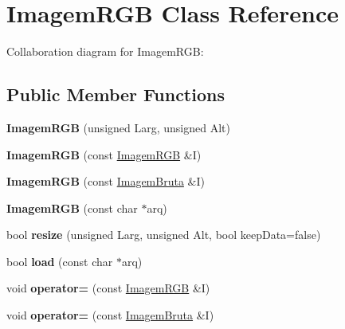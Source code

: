 \hypertarget{classImagemRGB}{}\section{Imagem\+R\+GB Class Reference}
\label{classImagemRGB}


Collaboration diagram for Imagem\+R\+GB\+:
\subsection*{Public Member Functions}
\begin{DoxyCompactItemize}
\item 
{\bfseries Imagem\+R\+GB} (unsigned Larg, unsigned Alt)\hypertarget{classImagemRGB_a94d1613764f95a46939aeba3f8acbdcd}{}\label{classImagemRGB_a94d1613764f95a46939aeba3f8acbdcd}

\item 
{\bfseries Imagem\+R\+GB} (const \hyperlink{classImagemRGB}{Imagem\+R\+GB} \&I)\hypertarget{classImagemRGB_a97d9fbc53efb4e5e2df75cf07bd8eefe}{}\label{classImagemRGB_a97d9fbc53efb4e5e2df75cf07bd8eefe}

\item 
{\bfseries Imagem\+R\+GB} (const \hyperlink{classImagemBruta}{Imagem\+Bruta} \&I)\hypertarget{classImagemRGB_a6f5bdc251304da955ae0a6589096e9d7}{}\label{classImagemRGB_a6f5bdc251304da955ae0a6589096e9d7}

\item 
{\bfseries Imagem\+R\+GB} (const char $\ast$arq)\hypertarget{classImagemRGB_a919b5e5865184cac8784730d841a2bfc}{}\label{classImagemRGB_a919b5e5865184cac8784730d841a2bfc}

\item 
bool {\bfseries resize} (unsigned Larg, unsigned Alt, bool keep\+Data=false)\hypertarget{classImagemRGB_a3f2573a593dea69d8c087299e880dcc7}{}\label{classImagemRGB_a3f2573a593dea69d8c087299e880dcc7}

\item 
bool {\bfseries load} (const char $\ast$arq)\hypertarget{classImagemRGB_a1f49dd4503d79d3098ce6e27bda3f241}{}\label{classImagemRGB_a1f49dd4503d79d3098ce6e27bda3f241}

\item 
void {\bfseries operator=} (const \hyperlink{classImagemRGB}{Imagem\+R\+GB} \&I)\hypertarget{classImagemRGB_a6a6cbbee289b624dd919917c0d8b831d}{}\label{classImagemRGB_a6a6cbbee289b624dd919917c0d8b831d}

\item 
void {\bfseries operator=} (const \hyperlink{classImagemBruta}{Imagem\+Bruta} \&I)\hypertarget{classImagemRGB_a958a98bf1e4facc40e1152aa2ec7e1a0}{}\label{classImagemRGB_a958a98bf1e4facc40e1152aa2ec7e1a0}


\end{DoxyCompactItemize}
